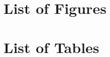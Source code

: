 \begin{appendices}
\chapter{List of Figures}
\listoffigures

\chapter{List of Tables}
\listoftables

\end{appendices}
